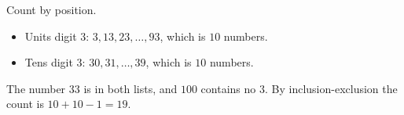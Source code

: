 Count by position.
\begin{itemize}
\item Units digit $3$: $3,13,23,\dots,93$, which is $10$ numbers.
\item Tens digit $3$: $30,31,\dots,39$, which is $10$ numbers.
\end{itemize}
The number $33$ is in both lists, and $100$ contains no $3$. By inclusion-exclusion the count is $10+10-1=\boxed{19}$.
